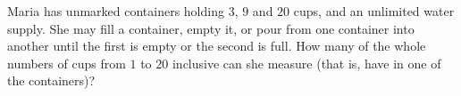 Maria has unmarked containers holding $3$, $9$ and $20$ cups, and an unlimited water supply. She may fill a container, empty it, or pour from one container into another until the first is empty or the second is full. How many of the whole numbers of cups from $1$ to $20$ inclusive can she measure (that is, have in one of the containers)?
